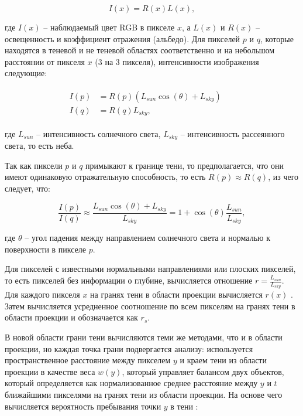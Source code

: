 \begin{equation}
	I(x) = R(x)L(x), 
\end{equation}

где $I(x)$ -- наблюдаемый цвет RGB в пикселе $x$, а $L(x)$ и $R(x)$ -- освещенность и коэффициент отражения (альбедо). Для пикселей $p$ и $q$, которые находятся в теневой и не теневой областях соответственно и на небольшом расстоянии от пикселя $x$ (3 на 3 пикселя), интенсивности изображения следующие:

\begin{equation}
	\begin{aligned}
		\begin{split}
			I(p) &= R(p)(L_{sun} \cos(\theta) + L_{sky}) &&\\
			I(q) &= R(q)L_{sky}, &&
		\end{split}
	\end{aligned}
\end{equation}

где $L_{sun}$ -- интенсивность солнечного света, $L_{sky}$ -- интенсивность рассеянного света, то есть неба.

Так как пиксели $p$ и $q$ примыкают к границе тени, то предполагается, что они имеют одинаковую отражательную способность, то есть $R(p) \approx R(q)$, из чего следует, что:

\begin{equation}
	\frac{I(p)}{I(q)} \approx \frac{L_{sun} \cos(\theta) + L_{sky}}{L_{sky}} = 1 + \cos(\theta)\frac{L_{sun}}{L_{sky}},
\end{equation}

где $\theta$ -- угол падения между направлением солнечного света и нормалью к поверхности в пикселе $p$.

Для пикселей с известными нормальными направлениями или плоских пикселей, то есть пикселей без информации о глубине, вычисляется отношение $r = \frac{L_{sun}}{L_{sky}}$. Для каждого пикселя $x$ на гранях тени в области проекции вычисляется $r(x)$ . Затем вычисляется усредненное соотношение по всем пикселям на гранях тени в области проекции и обозначается как $r_s$.

В новой области грани тени вычисляются теми же методами, что и в области проекции, но каждая точка грани подвергается анализу: используется пространственное расстояние между пикселем $y$ и краем тени из области проекции в качестве веса $w(y)$, который управляет балансом двух объектов, который определяется как нормализованное среднее расстояние между $y$ и $t$ ближайшими пикселями на гранях тени из области проекции. На основе чего вычисляется вероятность пребывания точки $y$ в тени \cite{wei2019simulating}:

